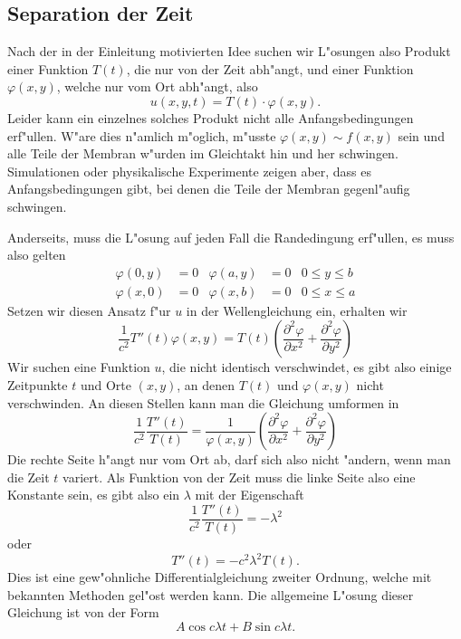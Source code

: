 \subsection{Separation der Zeit}
Nach der in der Einleitung motivierten Idee suchen wir L"osungen also
Produkt einer Funktion $T(t)$, die nur von der Zeit abh"angt, und einer Funktion
$\varphi(x,y)$, welche nur vom Ort abh"angt, also
\[
u(x,y,t)=T(t)\cdot\varphi(x,y).
\]
Leider kann ein einzelnes solches Produkt nicht alle Anfangsbedingungen
erf"ullen. W"are dies n"amlich m"oglich, m"usste $\varphi(x,y)\sim f(x,y)$
sein und alle Teile der Membran w"urden im Gleichtakt hin und her schwingen.
Simulationen oder physikalische Experimente zeigen aber, dass es
Anfangsbedingungen gibt, bei denen die Teile der Membran gegenl"aufig
schwingen.

Anderseits, muss die L"osung auf jeden Fall die Randedingung erf"ullen,
es muss also gelten
\begin{align*}
\varphi(0,y)&=0&\varphi(a,y)&=0&0\le y\le b\\
\varphi(x,0)&=0&\varphi(x,b)&=0&0\le x\le a
\end{align*}
Setzen wir diesen Ansatz f"ur $u$ in der Wellengleichung ein,
erhalten wir
\[
\frac1{c^2}T''(t)\varphi(x,y)=T(t)\left(
\frac{\partial^2\varphi}{\partial x^2}
+
\frac{\partial^2\varphi}{\partial y^2}
\right)
\]
Wir suchen eine Funktion $u$, die nicht identisch verschwindet,
es gibt also einige Zeitpunkte $t$ und Orte $(x,y)$, an denen $T(t)$
und $\varphi(x,y)$ nicht verschwinden. An diesen Stellen kann man die
Gleichung umformen in
\begin{equation}
\frac1{c^2}\frac{T''(t)}{T(t)}
= \frac1{\varphi(x,y)}\left( \frac{\partial^2\varphi}{\partial x^2}
+ \frac{\partial^2\varphi}{\partial y^2} \right)
\label{separiert}
\end{equation}
Die rechte Seite h"angt nur
vom Ort ab, darf sich also nicht "andern, wenn man die Zeit $t$ variert.
Als Funktion von der Zeit muss die linke Seite also eine Konstante sein,
es gibt also ein $\lambda$ mit der Eigenschaft
\[
\frac1{c^2}\frac{T''(t)}{T(t)}=-\lambda^2
\]
oder
\[
T''(t)=-c^2\lambda^2 T(t).
\]
Dies ist eine gew"ohnliche Differentialgleichung zweiter Ordnung, welche mit
bekannten Methoden gel"ost werden kann.
Die allgemeine L"osung dieser Gleichung ist von der Form
\[
A\cos c\lambda t+B\sin c\lambda t.
\]

